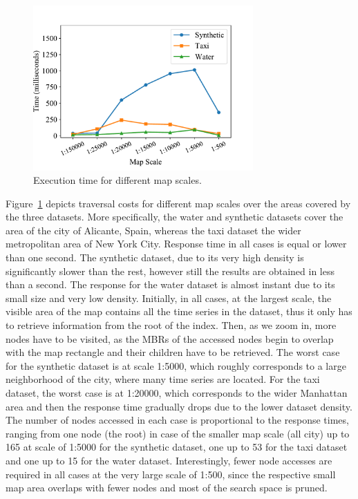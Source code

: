 \begin{figure}[!tb]
 \centering
 \includegraphics[width=0.75\textwidth]{figures/BTSR_zoom.pdf}
 \caption{Execution time for different map scales.}
 \label{fig:btsr_zoom}
\end{figure}


Figure~\ref{fig:btsr_zoom} depicts traversal costs for different map scales over the areas covered by the three datasets. More specifically, the water and synthetic datasets cover the area of the city of Alicante, Spain, whereas the taxi dataset the wider metropolitan area of New York City. Response time in all cases is equal or lower than one second. The synthetic dataset, due to its very high density is significantly slower than the rest, however still the results are obtained in less than a second. The response for the water dataset is almost instant due to its small size and very low density. Initially, in all cases, at the largest scale, the visible area of the map contains all the time series in the dataset, thus it only has to retrieve information from the root of the index. Then, as we zoom in, more nodes have to be visited, as the MBRs of the accessed nodes begin to overlap with the map rectangle and their children have to be retrieved. The worst case for the synthetic dataset is at scale 1:5000, which roughly corresponds to a large neighborhood of the city, where many time series are located. For the taxi dataset, the worst case is at 1:20000, which corresponds to the wider Manhattan area and then the response time gradually drops due to the lower dataset density. The number of nodes accessed in each case is proportional to the response times, ranging from one node (the root) in case of the smaller map scale (all city) up to 165 at scale of 1:5000 for the synthetic dataset, one up to 53 for the taxi dataset and one up to 15 for the water dataset. Interestingly, fewer node accesses are required in all cases at the very large scale of 1:500, since the respective small map area overlaps with fewer nodes and most of the search space is pruned. 


